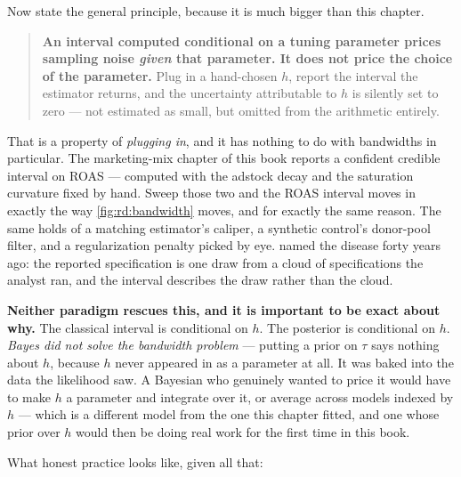 Now state the general principle, because it is much bigger than this chapter.

\begin{quote}
\textbf{An interval computed conditional on a tuning parameter prices sampling noise \emph{given}
that parameter. It does not price the choice of the parameter.} Plug in a hand-chosen $h$, report
the interval the estimator returns, and the uncertainty attributable to $h$ is silently set to zero
--- not estimated as small, but omitted from the arithmetic entirely.
\end{quote}

That is a property of \emph{plugging in}, and it has nothing to do with bandwidths in particular. The
marketing-mix chapter of this book reports a confident credible interval on ROAS --- computed with
the adstock decay and the saturation curvature fixed by hand. Sweep those two and the ROAS interval
moves in exactly the way \cref{fig:rd:bandwidth} moves, and for exactly the same reason. The same
holds of a matching estimator's caliper, a synthetic control's donor-pool filter, and a
regularization penalty picked by eye.  named the disease forty years ago: the
reported specification is one draw from a cloud of specifications the analyst ran, and the interval
describes the draw rather than the cloud.

\textbf{Neither paradigm rescues this, and it is important to be exact about why.} The classical
interval is conditional on $h$. The posterior is conditional on $h$. \emph{Bayes did not solve the
bandwidth problem} --- putting a prior on $\tau$ says nothing about $h$, because $h$ never appeared
in  as a parameter at all. It was baked into the data the
likelihood saw. A Bayesian who genuinely wanted to price it would have to make $h$ a parameter and
integrate over it, or average across models indexed by $h$ --- which is a different model from the
one this chapter fitted, and one whose prior over $h$ would then be doing real work for the first
time in this book.

What honest practice looks like, given all that:


